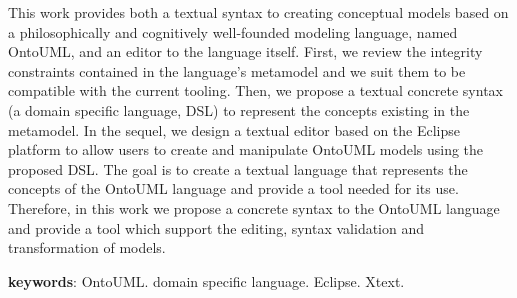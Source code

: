 \documentclass[
  10pt,				%
  oneside,
  a4paper,			%
  brazilian,
  english
]{abntex2}
\begin{document}
\begin{resumo}[Abstract]
  This work provides both a textual syntax to creating conceptual models 
  based on a philosophically and cognitively well-founded modeling language,
  named OntoUML, and an editor to the language itself.
%
  First, we review the integrity constraints contained in the language's metamodel
  and we suit them to be compatible with the current tooling.
%
  Then, we propose a textual concrete syntax (a domain specific language, DSL)
  to represent the concepts existing in the metamodel.
%
  In the sequel, we design a textual editor based on the Eclipse platform
  to allow users to create and manipulate OntoUML models using the proposed DSL.
%
  The goal is to create a textual language that represents the concepts of
  the OntoUML language and provide a tool needed for its use.
%
  Therefore, in this work we propose a concrete syntax to the OntoUML language
  and provide a tool which support the editing, syntax validation and
  transformation of models.

  \textbf{keywords}: OntoUML. domain specific language. Eclipse. Xtext.
\end{resumo}




\end{document}

